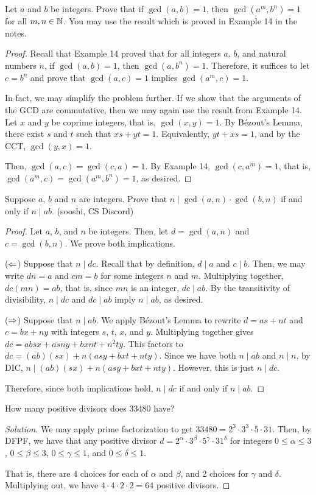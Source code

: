 \documentclass{agony}
\begin{document}
\question Let $a$ and $b$ be integers.
Prove that if $\gcd(a, b) = 1$, then $\gcd(a^m, b^n) = 1$ for all $m,n\in\mathbb{N}$.
You may use the result which is proved in Example 14 in the notes.
\begin{proof}
  Recall that Example 14 proved that for all integers $a$, $b$, and natural numbers $n$,
  if $\gcd(a, b)=1$, then $\gcd(a, b^n)=1$.
  Therefore, it suffices to let $c=b^n$ and prove that $\gcd(a, c)=1$ implies $\gcd(a^m, c)=1$.

  In fact, we may simplify the problem further.
  If we show that the arguments of the GCD are commutative,
  then we may again use the result from Example 14.
  Let $x$ and $y$ be coprime integers, that is, $\gcd(x,y)=1$.
  By Bézout's Lemma, there exist $s$ and $t$ such that $xs+yt=1$.
  Equivalently, $yt+xs=1$, and by the CCT, $\gcd(y,x)=1$.

  Then, $\gcd(a,c)=\gcd(c,a)=1$.
  By Example 14, $\gcd(c,a^m)=1$, that is, $\gcd(a^m,c)=\gcd(a^m,b^n)=1$, as desired.
\end{proof}


\question Suppose $a$, $b$ and $n$ are integers.
Prove that $n \mid \gcd(a, n) \cdot \gcd(b, n)$ if and only if $n \mid ab$.
(sooshi, CS Discord)
\begin{proof}
  Let $a$, $b$, and $n$ be integers.
  Then, let $d=\gcd(a,n)$ and $c=\gcd(b,n)$.
  We prove both implications.

  ($\Leftarrow$) Suppose that $n \mid dc$.
  Recall that by definition, $d \mid a$ and $c \mid b$.
  Then, we may write $dn=a$ and $cm=b$ for some integers $n$ and $m$.
  Multiplying together, $dc(mn)=ab$, that is, since $mn$ is an integer, $dc \mid ab$.
  By the transitivity of divisibility, $n \mid dc$ and $dc \mid ab$ imply $n \mid ab$, as desired.

  ($\Rightarrow$) Suppose that $n \mid ab$.
  We apply Bézout's Lemma to rewrite $d=as+nt$ and $c=bx+ny$ with integers $s$, $t$, $x$, and $y$.
  Multiplying together gives $dc = absx+asny+bxnt+n^2ty$.
  This factors to $dc = (ab)(sx)+n(asy+bxt+nty)$.
  Since we have both $n \mid ab$ and $n \mid n$, by DIC, $n \mid (ab)(sx)+n(asy+bxt+nty)$.
  However, this is just $n \mid dc$.

  Therefore, since both implications hold, $n \mid dc$ if and only if $n \mid ab$.
\end{proof}


\question How many positive divisors does 33480 have?
\begin{proof}[Solution]
  We may apply prime factorization to get $33480=2^3\cdot3^3\cdot5\cdot31$.
  Then, by DFPF, we have that any positive divisor $d=2^\alpha\cdot3^\beta\cdot5^\gamma\cdot31^\delta$
  for integers $0\leq\alpha\leq3$, $0\leq\beta\leq3$, $0\leq\gamma\leq1$, and $0\leq\delta\leq1$.

  That is, there are 4 choices for each of $\alpha$ and $\beta$, and 2 choices for $\gamma$ and $\delta$.
  Multiplying out, we have $4\cdot4\cdot2\cdot2=64$ positive divisors.
\end{proof}
\end{document}
